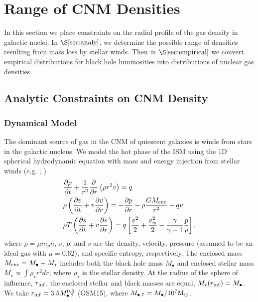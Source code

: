 \documentclass[usenatbib,fleqn]{mnras}
\newcommand{\Mbh}[1][]{M_{\bullet#1}}
\newcommand{\Menc}{M_{\rm enc}}
\newcommand{\Msun}{{\rm M_\odot}}
\begin{document}
\section{Range of CNM Densities}
\label{sec:cnm}

In this section we place constraints on the radial profile of the gas
density in galactic nuclei. In $\S\ref{sec:analy}$, we determine the
possible range of densities resulting from mass loss by stellar
winds. Then in $\S\ref{sec:empirical}$ we convert empirical
distributions for black hole luminosities into distributions of
nuclear gas densities.

\subsection{Analytic Constraints on CNM Density}
\label{sec:analy}

\subsubsection{Dynamical Model}
\label{sec:model}

The dominant source of gas in the CNM of quiescent galaxies is winds
from stars in the galactic nucleus. We model the hot phase of the ISM
using the 1D spherical hydrodynamic equation with mass and energy
injection from stellar winds (e.g. \citealt{Holzer+1970};
\citealt{Quataert2004})
\begin{align}
  &\frac{\partial \rho}{\partial t}+\frac{1}{r^2}\frac{\partial}{\partial r}\left(\rho r^2 v\right)=q \label{eq:drhodt}\\
  &\rho \left(\frac{\partial v}{\partial t} + v\frac{\partial
      v}{\partial r}\right) =-\frac{\partial p}{\partial r}- \rho\frac{GM_{\rm enc}}{r^{2}} -q v \label{eq:dvdt}\\
  &\rho T\left(\frac{\partial s}{\partial t} + v\frac{\partial
      s}{\partial
      r}\right)=q\left[\frac{v^2}{2}+\frac{v_w^2}{2}-\frac{\gamma}{\gamma-1}
    \frac{p}{\rho} \right] ,
\label{eq:model}
\end{align}
where $\rho = \mu m_p n$, $v$, $p$, and $s$ are the density, velocity,
pressure (assumed to be an ideal gas with $\mu = 0.62$), and specific
entropy, respectively.  The enclosed mass $\Menc = M_{\bullet} +
M_{\star}$ includes both the black hole mass $M_{\bullet}$ and
enclosed stellar mass $M_{\star} \propto \int \rho_{\star}r^{2}dr$,
where $\rho_{\star}$ is the stellar density. At the radius of the
sphere of influence, $r_{\rm inf}$, the enclosed stellar and black
masses are equal, $M_{\star}(r_{\rm inf})=\Mbh$.  We take $r_{\rm
  inf}=3.5 \Mbh[,7]^{0.6}$ (GSM15), where $\Mbh[,7]=\Mbh/10^7 \Msun$.
\end{document}
